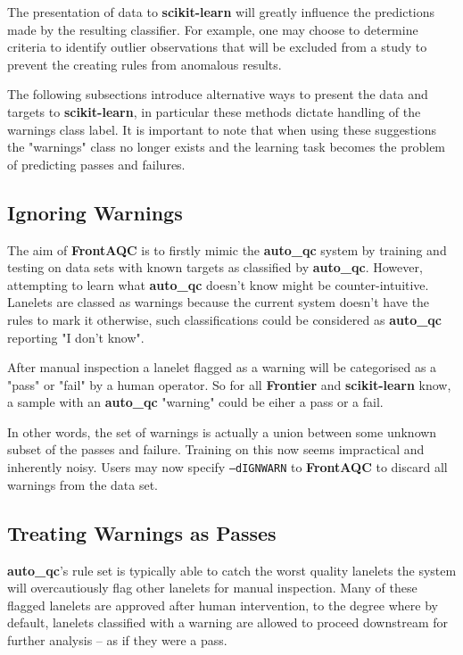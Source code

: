 The presentation of data to \textbf{scikit-learn} will greatly influence the
predictions made by the resulting classifier. For example, one may choose to
determine criteria to identify outlier observations that will be excluded from a
study to prevent the creating rules from anomalous results.

The following subsections introduce alternative ways to present the data and
targets to \textbf{scikit-learn}, in particular these methods dictate handling
of the warnings class label. It is important to note that when using these
suggestions the "warnings" class no longer exists and the learning task becomes
the problem of predicting passes and failures.

\subsection{Ignoring Warnings}

The aim of \textbf{FrontAQC} is to firstly mimic the \textbf{auto\_qc} system by
training and testing on data sets with known targets as classified by
\textbf{auto\_qc}. However, attempting to learn what \textbf{auto\_qc} doesn't
know might be counter-intuitive. Lanelets are classed as warnings because the
current system doesn't have the rules to mark it otherwise, such classifications
could be considered as \textbf{auto\_qc} reporting "I don't know".

After manual inspection a lanelet flagged as a warning will be categorised as a
"pass" or "fail" by a human operator. So for all \textbf{Frontier} and
\textbf{scikit-learn} know, a sample with an \textbf{auto\_qc} "warning" could
be eiher a pass or a fail.

In other words, the set of warnings is actually a union between some unknown
subset of the passes and failure. Training on this now seems impractical and
inherently noisy. Users may now specify \texttt{--dIGNWARN} to \textbf{FrontAQC}
to discard all warnings from the data set.


\subsection{Treating Warnings as Passes}

\textbf{auto\_qc}'s rule set is typically able to catch the worst quality
lanelets the system will overcautiously flag other lanelets for manual
inspection. Many of these flagged lanelets are approved after human
intervention, to the degree where by default, lanelets classified with a warning
are allowed to proceed downstream for further analysis -- as if they were a
pass.

